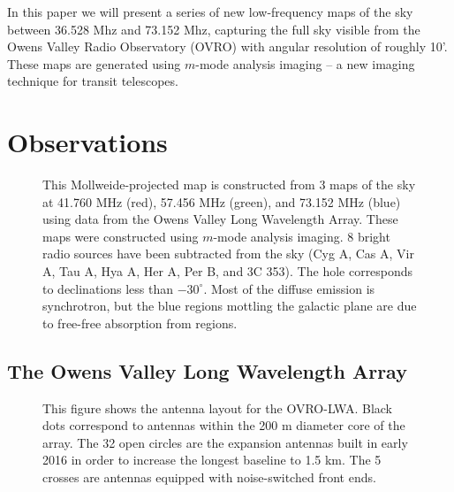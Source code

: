 \documentclass[twocolumn]{aastex61}
\begin{document}
In this paper we will present a series of new low-frequency maps of the sky between 36.528 Mhz and
73.152 Mhz, capturing the full sky visible from the Owens Valley Radio Observatory (OVRO) with
angular resolution of roughly 10'. These maps are generated using $m$-mode analysis imaging -- a new
imaging technique for transit telescopes.

\section{Observations}

\begin{figure*}[ht]
    \caption{
        This Mollweide-projected map is constructed from 3 maps of the sky at 41.760 MHz (red),
        57.456 MHz (green), and 73.152 MHz (blue) using data from the Owens Valley Long Wavelength
        Array. These maps were constructed using $m$-mode analysis imaging. 8 bright radio sources
        have been subtracted from the sky (Cyg A, Cas A, Vir A, Tau A, Hya A, Her A, Per B, and 3C
        353). The hole corresponds to declinations less than $-30^\circ$. Most of the diffuse
        emission is synchrotron, but the blue regions mottling the galactic plane are due to
        free-free absorption from  regions.
    }
    \label{fig:rgb}
\end{figure*}

\subsection{The Owens Valley Long Wavelength Array}

\begin{figure}[t]
    \caption{
        This figure shows the antenna layout for the OVRO-LWA. Black dots correspond to antennas
        within the 200 m diameter core of the array. The 32 open circles are the expansion antennas
        built in early 2016 in order to increase the longest baseline to 1.5 km. The 5 crosses are
        antennas equipped with noise-switched front ends.
    }
    \label{fig:antenna-layout}
\end{figure}
\end{document}
